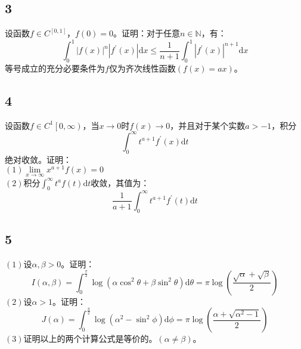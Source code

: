 \documentclass[a4paper,12pt]{article}
\begin{document}
\subsection*{3}\noindent 设函数$f\in C^{\left[0,1\right]}$，$f\left(0\right)=0$。证明：对于任意$n\in\mathbb{N}$，有：
\begin{equation*}
	\int_{0}^{1}\left|f\left(x\right)\right|^{n}\left|f^{\prime}\left(x\right)\right|\mathrm{d}x\leq \frac{1}{n+1}\int_{0}^{1}\left|f^{\prime}\left(x\right)\right|^{n+1}\mathrm{d}x
\end{equation*}
等号成立的充分必要条件为$f$仅为齐次线性函数$\left(f\left(x\right)=ax\right)$。
\subsection*{4}\noindent 设函数$f\in C^{1}\left[0,\infty\right)$，当$x\rightarrow 0$时$f\left(x\right)\rightarrow0$，并且对于某个实数$a>-1$，积分\begin{equation*}
	\int_{0}^{\infty}t^{a+1}f^{\prime}\left(x\right)\mathrm{d}t
\end{equation*}
绝对收敛。证明：\\
\noindent$\left(1\right)$$\lim\limits_{x\rightarrow\infty}x^{a+1}f\left(x\right)=0$\\
\noindent$\left(2\right)$积分$\int_{0}^{\infty}t^{a}f\left(t\right)\mathrm{d}t$收敛，其值为：
\begin{equation*}
	\frac{1}{a+1}\int_{0}^{\infty}t^{a+1}f^{\prime}\left(t\right)\mathrm{d}t
\end{equation*}
\subsection*{5}\noindent$\left(1\right)$设$\alpha,\beta >0$。证明：
\begin{equation*}
	I\left(\alpha,\beta\right)=\int_{0}^{\frac{\pi}{2}}\log\left(\alpha\cos^2\theta+\beta\sin^2\theta\right)\mathrm{d}\theta=\pi\log\left(\frac{\sqrt{\alpha}+\sqrt{\beta}}{2}\right)
\end{equation*}
\noindent $\left(2\right)$设$\alpha>1$。证明：
\begin{equation*}
	J\left(\alpha\right)=\int_{0}^{\frac{\pi}{2}}\log\left(\alpha^2-\sin^2\phi\right)\mathrm{d}\phi=\pi\log\left(\frac{\alpha+\sqrt{\alpha^2-1}}{2}\right)
\end{equation*}
\noindent $\left(3\right)$证明以上的两个计算公式是等价的。$\left(\alpha\neq\beta\right)$。
\end{document}
